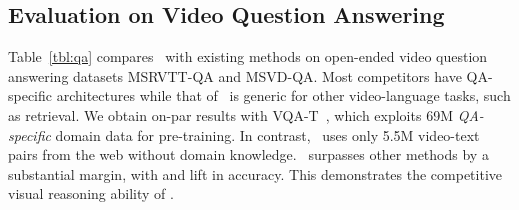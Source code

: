 \documentclass[10pt,twocolumn,letterpaper]{article}
\begin{document}
\vspace{-1ex}
\subsection{Evaluation on Video Question Answering}\label{sec:exp-qa}
\vspace{-0.5ex}
Table~\ref{tbl:qa} compares \name~with existing methods on open-ended video question answering datasets MSRVTT-QA and MSVD-QA.
Most competitors have QA-specific architectures while that of \name~is generic for other video-language tasks, such as retrieval.
We obtain on-par results with VQA-T~\cite{yang2021just}, which exploits 69M \emph{QA-specific} domain data for pre-training.
In contrast, \name~uses only 5.5M video-text pairs from the web without domain knowledge.
\name~surpasses other methods by a substantial margin, with  and  lift in accuracy.
This demonstrates the competitive visual reasoning ability of \name.

\vspace{-0.5ex}
\end{document}
